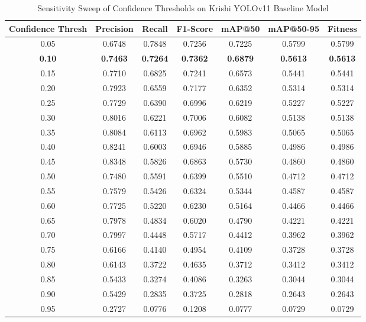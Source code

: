 \documentclass{article}
\begin{document}
\begin{table}[htbp]
  \centering
  \caption{Sensitivity Sweep of Confidence Thresholds on Krishi YOLOv11 Baseline Model}
  \label{tab:threshold_sensitivity_sweep}
  \begin{tabular}{ccccccc}
    \toprule
    \textbf{Confidence Thresh} & \textbf{Precision} & \textbf{Recall} & \textbf{F1-Score} & \textbf{mAP@50} & \textbf{mAP@50-95} & \textbf{Fitness} \\
    \midrule
    0.05 & 0.6748 & 0.7848 & 0.7256 & 0.7225 & 0.5799 & 0.5799 \\
    \textbf{0.10} & \textbf{0.7463} & \textbf{0.7264} & \textbf{0.7362} & \textbf{0.6879} & \textbf{0.5613} & \textbf{0.5613} \\
    0.15 & 0.7710 & 0.6825 & 0.7241 & 0.6573 & 0.5441 & 0.5441 \\
    0.20 & 0.7923 & 0.6559 & 0.7177 & 0.6352 & 0.5314 & 0.5314 \\
    0.25 & 0.7729 & 0.6390 & 0.6996 & 0.6219 & 0.5227 & 0.5227 \\
    0.30 & 0.8016 & 0.6221 & 0.7006 & 0.6082 & 0.5138 & 0.5138 \\
    0.35 & 0.8084 & 0.6113 & 0.6962 & 0.5983 & 0.5065 & 0.5065 \\
    0.40 & 0.8241 & 0.6003 & 0.6946 & 0.5885 & 0.4986 & 0.4986 \\
    0.45 & 0.8348 & 0.5826 & 0.6863 & 0.5730 & 0.4860 & 0.4860 \\
    0.50 & 0.7480 & 0.5591 & 0.6399 & 0.5510 & 0.4712 & 0.4712 \\
    0.55 & 0.7579 & 0.5426 & 0.6324 & 0.5344 & 0.4587 & 0.4587 \\
    0.60 & 0.7725 & 0.5220 & 0.6230 & 0.5164 & 0.4466 & 0.4466 \\
    0.65 & 0.7978 & 0.4834 & 0.6020 & 0.4790 & 0.4221 & 0.4221 \\
    0.70 & 0.7997 & 0.4448 & 0.5717 & 0.4412 & 0.3962 & 0.3962 \\
    0.75 & 0.6166 & 0.4140 & 0.4954 & 0.4109 & 0.3728 & 0.3728 \\
    0.80 & 0.6143 & 0.3722 & 0.4635 & 0.3712 & 0.3412 & 0.3412 \\
    0.85 & 0.5433 & 0.3274 & 0.4086 & 0.3263 & 0.3044 & 0.3044 \\
    0.90 & 0.5429 & 0.2835 & 0.3725 & 0.2818 & 0.2643 & 0.2643 \\
    0.95 & 0.2727 & 0.0776 & 0.1208 & 0.0777 & 0.0729 & 0.0729 \\
    \bottomrule
  \end{tabular}
\end{table}
\end{document}
